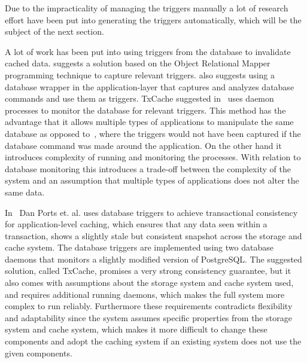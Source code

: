 
Due to the impracticality of managing the triggers manually a lot of research effort have been put into generating the triggers automatically, which will be the subject of the next section.




A lot of work has been put into using triggers from the database to invalidate cached data. \cite{paper:cache-genie} suggests a solution based on the Object Relational Mapper programming technique to capture relevant triggers. \cite{paper:deploy-time} also suggests using a database wrapper in the application-layer that captures and analyzes database commands and use them as triggers. TxCache suggested in~\cite{paper:liskov} uses daemon processes to monitor the database for relevant triggers. This method has the advantage that it allows multiple types of applications to manipulate the same database as opposed to~\cite{paper:cache-genie, paper:deploy-time}, where the triggers would not have been captured if the database command was made around the application. On the other hand it introduces complexity of running and monitoring the processes. With relation to database monitoring this introduces a trade-off between the complexity of the system and an assumption that multiple types of applications does not alter the same data.


In~\cite{paper:liskov} Dan Ports et. al. uses database triggers to achieve transactional consistency for application-level caching, which ensures that any data seen within a transaction, shows a slightly stale but consistent snapshot across the storage and cache system. The database triggers are implemented using two database daemons that monitors a slightly modified version of PostgreSQL. The suggested solution, called TxCache, promises a very strong consistency guarantee, but it also comes with assumptions about the storage system and cache system used, and requires additional running daemons, which makes the full system more complex to run reliably. Furthermore these requirements contradicts flexibility and adaptability since the system assumes specific properties from the storage system and cache system, which makes it more difficult to change these components and adopt the caching system if an existing system does not use the given components.

